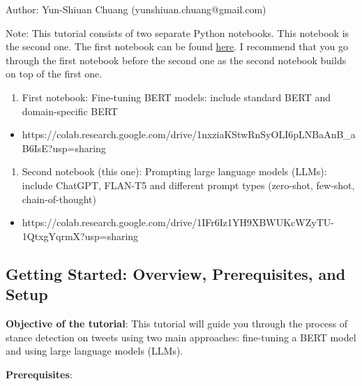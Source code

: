 \documentclass[11pt]{article}
\providecommand{\tightlist}{%
      \setlength{\itemsep}{0pt}\setlength{\parskip}{0pt}}
\begin{document}
Author: Yun-Shiuan Chuang (yunshiuan.chuang@gmail.com)

Note: This tutorial consists of two separate Python notebooks. This
notebook is the second one. The first notebook can be found
\href{https://colab.research.google.com/drive/1nxziaKStwRnSyOLI6pLNBaAnB_aB6IsE?usp=sharing}{here}.
I recommend that you go through the first notebook before the second one
as the second notebook builds on top of the first one.

\begin{enumerate}
\def\labelenumi{\arabic{enumi}.}
\tightlist
\item
  First notebook: Fine-tuning BERT models: include standard BERT and
  domain-specific BERT
\end{enumerate}

\begin{itemize}
\tightlist
\item
  https://colab.research.google.com/drive/1nxziaKStwRnSyOLI6pLNBaAnB\_aB6IsE?usp=sharing
\end{itemize}

\begin{enumerate}
\def\labelenumi{\arabic{enumi}.}
\setcounter{enumi}{1}
\tightlist
\item
  Second notebook (this one): Prompting large language models (LLMs):
  include ChatGPT, FLAN-T5 and different prompt types (zero-shot,
  few-shot, chain-of-thought)
\end{enumerate}

\begin{itemize}
\tightlist
\item
  https://colab.research.google.com/drive/1IFr6Iz1YH9XBWUKcWZyTU-1QtxgYqrmX?usp=sharing
\end{itemize}

    \hypertarget{getting-started-overview-prerequisites-and-setup}{%
\subsection{Getting Started: Overview, Prerequisites, and
Setup}\label{getting-started-overview-prerequisites-and-setup}}

\textbf{Objective of the tutorial}: This tutorial will guide you through
the process of stance detection on tweets using two main approaches:
fine-tuning a BERT model and using large language models (LLMs).

\textbf{Prerequisites}:
\end{document}
